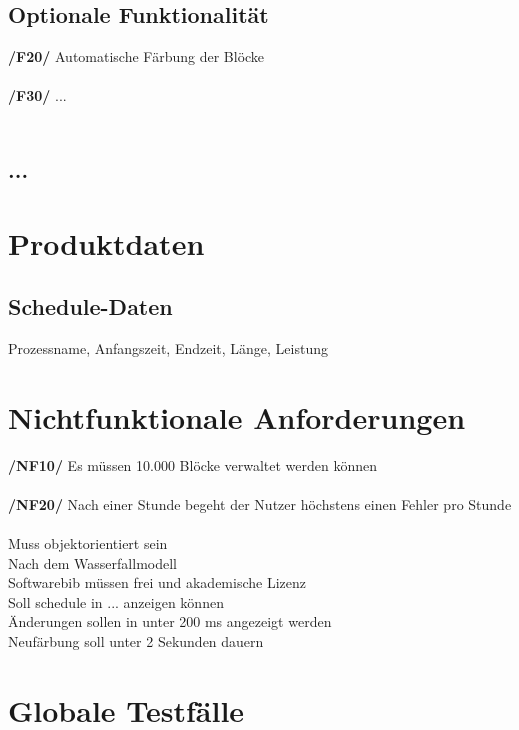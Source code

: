 \documentclass[parskip=full]{scrartcl}
\begin{document}
		\subsection{Optionale Funktionalität}
			\textbf{/F20/} Automatische Färbung der Blöcke\\\\
			
			\textbf{/F30/} ...\\\\
	
				
		\subsection{...}
		
	\section{Produktdaten}
		\subsection{Schedule-Daten}
			Prozessname, Anfangszeit, Endzeit, Länge, Leistung
			
	\section{Nichtfunktionale 		Anforderungen}
		
		
			\textbf{/NF10/} Es müssen 10.000 Blöcke verwaltet werden können\\\\
			
			\textbf{/NF20/} Nach einer Stunde begeht der Nutzer höchstens einen Fehler pro Stunde\\\\
			Muss objektorientiert sein\\
			Nach dem Wasserfallmodell\\
			Softwarebib müssen frei und akademische Lizenz\\
			Soll schedule in ... anzeigen können\\
			Änderungen sollen in unter 200 ms angezeigt werden\\
			Neufärbung soll unter 2 Sekunden dauern\\
			
			
			
	\section{Globale Testfälle}
\end{document}
